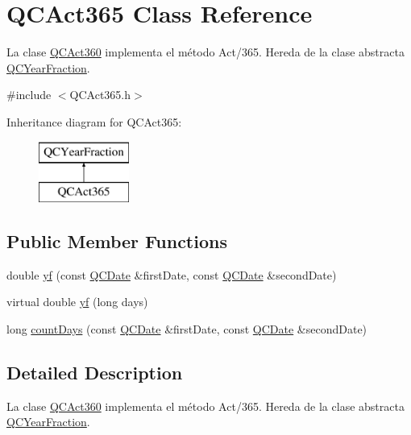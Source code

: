 \hypertarget{class_q_c_act365}{\section{Q\+C\+Act365 Class Reference}
\label{class_q_c_act365}
}


La clase \hyperlink{class_q_c_act360}{Q\+C\+Act360} implementa el método Act/365. Hereda de la clase abstracta \hyperlink{class_q_c_year_fraction}{Q\+C\+Year\+Fraction}.  




{\ttfamily \#include $<$Q\+C\+Act365.\+h$>$}

Inheritance diagram for Q\+C\+Act365\+:\begin{figure}[H]
\begin{center}
\leavevmode
\includegraphics[height=2.000000cm]{class_q_c_act365}
\end{center}
\end{figure}
\subsection*{Public Member Functions}
\begin{DoxyCompactItemize}
\item 
double \hyperlink{class_q_c_act365_ae9ef9155b65718a4e7af7c706c576d95}{yf} (const \hyperlink{class_q_c_date}{Q\+C\+Date} \&first\+Date, const \hyperlink{class_q_c_date}{Q\+C\+Date} \&second\+Date)
\item 
virtual double \hyperlink{class_q_c_act365_a9579bfd75fece5fbd5391a57348f6d1e}{yf} (long days)
\item 
long \hyperlink{class_q_c_act365_a56509add10cf3573bd568390d1035d0b}{count\+Days} (const \hyperlink{class_q_c_date}{Q\+C\+Date} \&first\+Date, const \hyperlink{class_q_c_date}{Q\+C\+Date} \&second\+Date)
\end{DoxyCompactItemize}


\subsection{Detailed Description}
La clase \hyperlink{class_q_c_act360}{Q\+C\+Act360} implementa el método Act/365. Hereda de la clase abstracta \hyperlink{class_q_c_year_fraction}{Q\+C\+Year\+Fraction}. 

